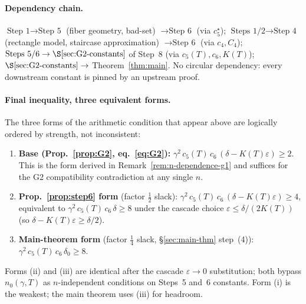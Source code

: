 \begin{remark}
\paragraph{Dependency chain.} $\text{Step 1}\to\text{Step 5}$ (fiber
geometry, bad-set) $\to\text{Step 6}$ (via $c_5^\star$);
$\text{Steps 1/2}\to\text{Step 4}$ (rectangle model, staircase
approximation) $\to\text{Step 6}$ (via $c_4, C_4$);
$\text{Steps 5/6}\to\S\ref{sec:G2-constants}$ of Step~8 (via
$c_5(T), c_6, K(T)$); $\S\ref{sec:G2-constants}\to$
Theorem~\ref{thm:main}. No circular dependency: every downstream
constant is pinned by an upstream proof.

\paragraph{Final inequality, three equivalent forms.} The three
forms of the arithmetic condition that appear above are logically
ordered by strength, not inconsistent:
\begin{enumerate}[nosep, label=(\roman*)]
 \item \textbf{Base (Prop.~\ref{prop:G2}, eq.~\eqref{eq:G2}):}
 $\gamma^2\,c_5(T)\,c_6\,(\delta - K(T)\varepsilon) \ge 2$.
 This is the form derived in Remark~\ref{rem:n-dependence-g1} and
 suffices for the G2 compatibility contradiction at any single $n$.
 \item \textbf{Prop.~\ref{prop:step6} form} (factor $\tfrac12$ slack):
 $\gamma^2\,c_5(T)\,c_6\,(\delta - K(T)\varepsilon) \ge 4$, equivalent
 to $\gamma^2\,c_5(T)\,c_6\,\delta \ge 8$ under the cascade choice
 $\varepsilon\le\delta/(2K(T))$ (so $\delta - K(T)\varepsilon\ge\delta/2$).
 \item \textbf{Main-theorem form} (factor $\tfrac14$ slack,
 \S\ref{sec:main-thm} step~(4)):
 $\gamma^2\,c_5(T)\,c_6\,\delta_0 \ge 8$.
\end{enumerate}
Forms (ii) and (iii) are identical after the cascade $\varepsilon\to 0$
substitution; both bypass $n_0(\gamma,T)$ as $n$-independent
conditions on Steps~5 and~6 constants. Form (i) is the weakest; the
main theorem uses (iii) for headroom.


\end{remark}
